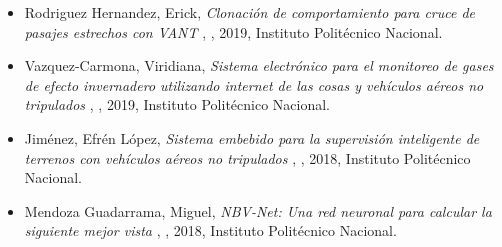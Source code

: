\begin{itemize} 
\item Rodriguez Hernandez, Erick, \textit{ Clonaci\'on de comportamiento para cruce de pasajes estrechos con VANT }, \href{ https://jivasquez.files.wordpress.com/2019/08/tesiserhempastar.pdf }{\faFilePdfO}, 2019, Instituto Polit\'ecnico Nacional. 
\item Vazquez-Carmona, Viridiana, \textit{ Sistema electr\'onico para el monitoreo de gases de efecto invernadero utilizando internet de las cosas y veh\'iculos a\'ereos no tripulados }, \href{ https://jivasquez.files.wordpress.com/2020/09/2019_maestria_vazquez.pdf }{\faFilePdfO}, 2019, Instituto Polit\'ecnico Nacional. 
\item Jim{\'e}nez, Efr{\'e}n L{\'o}pez, \textit{ Sistema embebido para la supervisi{\'o}n inteligente de terrenos con veh{\'i}culos a{\'e}reos no tripulados }, \href{ https://jivasquez.files.wordpress.com/2018/12/master_thesis_2018_lopez.pdf }{\faFilePdfO}, 2018, Instituto Polit{\'e}cnico Nacional. 
\item Mendoza Guadarrama, Miguel, \textit{ NBV-Net: Una red neuronal para calcular la siguiente mejor vista }, \href{ https://jivasquez.files.wordpress.com/2018/12/2018_maestria_Mendoza.pdf }{\faFilePdfO}, 2018, Instituto Politécnico Nacional. 
\end{itemize} 
